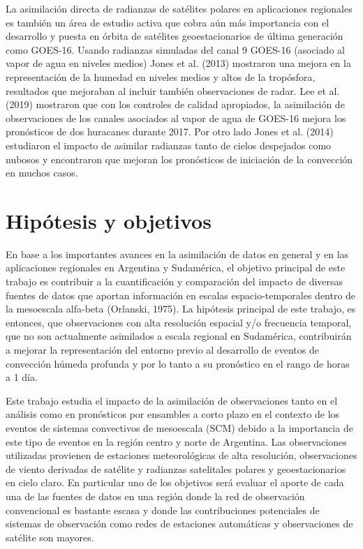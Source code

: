 \documentclass[12pt,oneside,a4paper]{reedthesis}
\begin{document}
La asimilación directa de radianzas de satélites polares en aplicaciones regionales es también un área de estudio activa que cobra aún más importancia con el desarrollo y puesta en órbita de satélites geoestacionarios de última generación como GOES-16. Usando radianzas simuladas del canal 9 GOES-16 (asociado al vapor de agua en niveles medios) Jones et al. (2013) mostraron una mejora en la representación de la humedad en niveles medios y altos de la tropósfora, resultados que mejoraban al incluir también observaciones de radar. Lee et al. (2019) mostraron que con los controles de calidad apropiados, la asimilación de observaciones de los canales asociados al vapor de agua de GOES-16 mejora los pronósticos de dos huracanes durante 2017. Por otro lado Jones et al. (2014) estudiaron el impacto de asimilar radianzas tanto de cielos despejados como nubosos y encontraron que mejoran los pronósticos de iniciación de la convección en muchos casos.

\hypertarget{hipuxf3tesis-y-objetivos}{%
\section{Hipótesis y objetivos}\label{hipuxf3tesis-y-objetivos}}

En base a los importantes avances en la asimilación de datos en general y en las aplicaciones regionales en Argentina y Sudamérica, el objetivo principal de este trabajo es contribuir a la cuantificación y comparación del impacto de diversas fuentes de datos que aportan información en escalas espacio-temporales dentro de la mesoescala alfa-beta (Orlanski, 1975). La hipótesis principal de este trabajo, es entonces, que observaciones con alta resolución espacial y/o frecuencia temporal, que no son actualmente asimilados a escala regional en Sudamérica, contribuirán a mejorar la representación del entorno previo al desarrollo de eventos de convección húmeda profunda y por lo tanto a su pronóstico en el rango de horas a 1 día.

Este trabajo estudia el impacto de la asimilación de observaciones tanto en el análisis como en pronósticos por ensambles a corto plazo en el contexto de los eventos de sistemas convectivos de mesoescala (SCM) debido a la importancia de este tipo de eventos en la región centro y norte de Argentina. Las observaciones utilizadas provienen de estaciones meteorológicas de alta resolución, observaciones de viento derivadas de satélite y radianzas satelitales polares y geoestacionarios en cielo claro. En particular uno de los objetivos será evaluar el aporte de cada una de las fuentes de datos en una región donde la red de observación convencional es bastante escasa y donde las contribuciones potenciales de sistemas de observación como redes de estaciones automáticas y observaciones de satélite son mayores.
\end{document}
